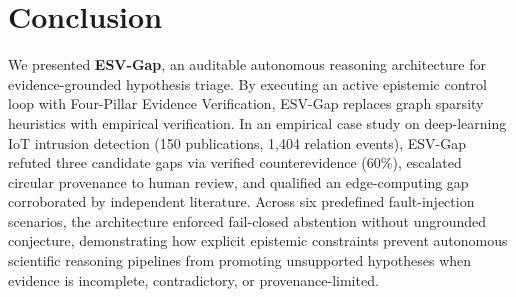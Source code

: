 \documentclass[runningheads]{llncs}
\newcommand{\method}{ESV-Gap}
\begin{document}
\section{Conclusion}
\label{sec:conclusion}

We presented \textbf{\method{}}, an auditable autonomous reasoning architecture for evidence-grounded hypothesis triage. By executing an active epistemic control loop with Four-Pillar Evidence Verification, \method{} replaces graph sparsity heuristics with empirical verification. In an empirical case study on deep-learning IoT intrusion detection (150 publications, 1,404 relation events), \method{} refuted three candidate gaps via verified counterevidence ($60\%$), escalated circular provenance to human review, and qualified an edge-computing gap corroborated by independent literature. Across six predefined fault-injection scenarios, the architecture enforced fail-closed abstention without ungrounded conjecture, demonstrating how explicit epistemic constraints prevent autonomous scientific reasoning pipelines from promoting unsupported hypotheses when evidence is incomplete, contradictory, or provenance-limited.



\end{document}
